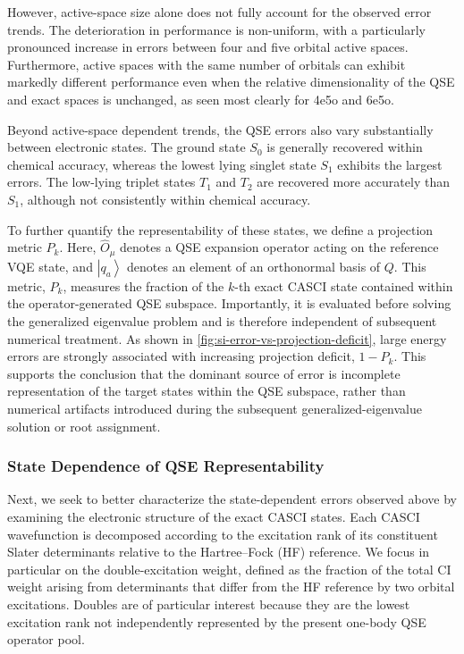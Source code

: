 However, active-space size alone does not fully account for the observed error trends. 
The deterioration in performance is non-uniform, with a particularly pronounced increase in errors between four and five orbital active spaces. 
Furthermore, active spaces with the same number of orbitals can exhibit markedly different performance even when the relative dimensionality of the QSE and exact spaces is unchanged, as seen most clearly for 4e5o and 6e5o.

Beyond active-space dependent trends, the QSE errors also vary substantially between electronic states. The ground state $S_0$ is generally recovered within chemical accuracy, whereas the lowest lying singlet state $S_1$ exhibits the largest errors. 
The low-lying triplet states $T_1$ and $T_2$ are recovered more accurately than $S_1$, although not consistently within chemical accuracy. 

To further quantify the representability of these states, we define a projection metric $P_k$.
\QSEProjectionEquation
Here, $\hat{O}_{\mu}$ denotes a QSE expansion operator acting on the reference VQE state, and ${\left|q_a\right\rangle}$ denotes an element of an orthonormal basis of $Q$. 
This metric, $P_k$, measures the fraction of the $k$-th exact CASCI state contained within the operator-generated QSE subspace. 
Importantly, it is evaluated before solving the generalized eigenvalue problem and is therefore independent of subsequent numerical treatment.
As shown in \cref{fig:si-error-vs-projection-deficit}, large energy errors are strongly associated with increasing projection deficit, $1-P_k$. 
This supports the conclusion that the dominant source of error is incomplete representation of the target states within the QSE subspace, rather than numerical artifacts introduced during the subsequent generalized-eigenvalue solution or root assignment.

\subsubsection{State Dependence of QSE Representability}
Next, we seek to better characterize the state-dependent errors observed above by examining the electronic structure of the exact CASCI states. 
Each CASCI wavefunction is decomposed according to the excitation rank of its constituent Slater determinants relative to the Hartree–Fock (HF) reference. 
We focus in particular on the double-excitation weight, defined as the fraction of the total CI weight arising from determinants that differ from the HF reference by two orbital excitations. 
Doubles are of particular interest because they are the lowest excitation rank not independently represented by the present one-body QSE operator pool. 

